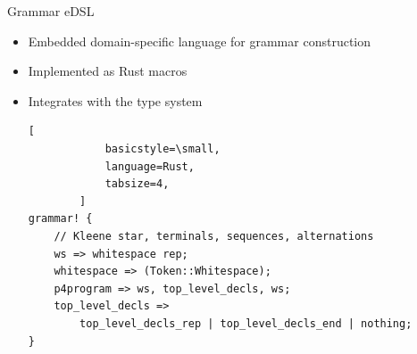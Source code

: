 \documentclass[aspectratio=169]{beamer}
\begin{document}
\begin{frame}[fragile]{Grammar eDSL}
	\begin{itemize}
		\item Embedded domain-specific language for \alert{grammar construction}
		\pause
		\item Implemented as Rust macros \pause
		\item Integrates with the type system \pause
		\begin{lstlisting}[
			basicstyle=\small,
			language=Rust,
			tabsize=4,
		]
grammar! {
	// Kleene star, terminals, sequences, alternations
	ws => whitespace rep;
	whitespace => (Token::Whitespace);
	p4program => ws, top_level_decls, ws;
	top_level_decls =>
		top_level_decls_rep | top_level_decls_end | nothing;
}
		\end{lstlisting}
	\end{itemize}
\end{frame}
\end{document}
